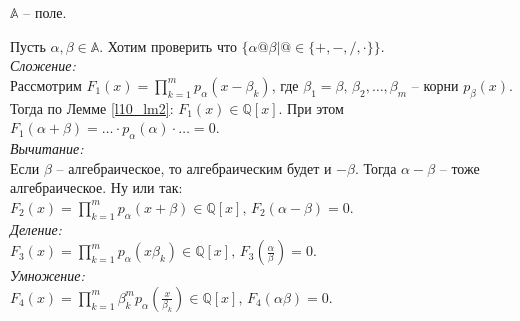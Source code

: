 \begin{theorem} \label{l10_th1}
	$\mathbb{A}$ -- поле.
\end{theorem}
\begin{pf}
	Пусть $\alpha, \beta \in \mathbb{A}$. Хотим проверить что $\{ \alpha @ \beta \vert @ \in \{+, -, /, \cdot \} \}$.\\
	\textit{Сложение:}\\
	Рассмотрим $\displaystyle F_1(x) = \prod\limits_{k=1}^m p_\alpha\left( x-\beta_k \right)$, где $\beta_1 = \beta, \, \beta_2,\dots,\beta_m$ -- корни $p_\beta(x)$. Тогда по Лемме \ref{l10_lm2}: $F_1(x) \in \mathbb{Q}[x]$. При этом $\displaystyle F_1(\alpha + \beta) = \dots \cdot p_\alpha(\alpha) \cdot \dots = 0$.\\
	\textit{Вычитание:}\\
Если $\beta$ -- алгебраическое, то алгебраическим будет и $-\beta$. Тогда $\alpha-\beta$ -- тоже алгебраическое. Ну или так: $\displaystyle F_2(x) = \prod\limits_{k=1}^m p_\alpha \left( x+\beta \right) \in \mathbb{Q}[x], \, F_2(\alpha-\beta)=0$.\\
	\textit{Деление:}\\
	$\displaystyle F_3(x) = \prod\limits_{k=1}^m p_\alpha\left( x\beta_k \right) \in \mathbb{Q}[x], \, F_3\left( \frac{\alpha}{\beta} \right) = 0$.\\
	\textit{Умножение:}\\
	$\displaystyle F_4(x) = \prod\limits_{k=1}^m \beta_k^m p_\alpha\left( \frac{x}{\beta_k} \right) \in \mathbb{Q}[x], \, F_4\left( \alpha\beta \right) = 0$.
\end{pf}